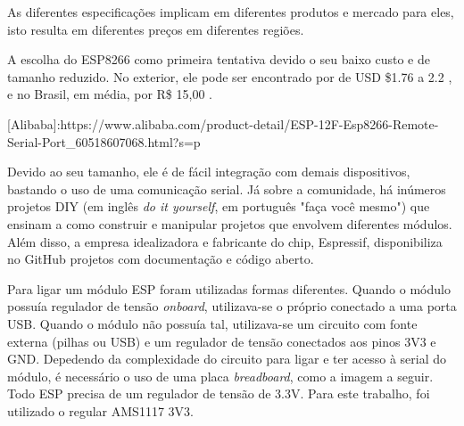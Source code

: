 As diferentes especificações implicam em diferentes produtos e mercado para
eles, isto resulta em diferentes preços em diferentes regiões.

\begin{table}[htb]
\end{table}

A escolha do ESP8266 como primeira tentativa devido o seu baixo custo e de
tamanho reduzido. No exterior, ele pode ser encontrado por de
USD \$1.76 a 2.2 , e no
Brasil, em média, por R\$ 15,00 .

[Alibaba]:https://www.alibaba.com/product-detail/ESP-12F-Esp8266-Remote-Serial-Port_60518607068.html?s=p

Devido ao seu tamanho, ele é de fácil integração com demais dispositivos,
bastando o uso de uma comunicação serial. Já sobre a comunidade, há inúmeros
projetos DIY (em inglês \emph{do it yourself}, em português "faça você mesmo") que
ensinam a como construir e manipular projetos que envolvem diferentes módulos.
Além disso, a empresa  idealizadora e fabricante do chip, Espressif,
disponibiliza no GitHub projetos com documentação e código aberto.


Para ligar um módulo ESP foram utilizadas formas diferentes. Quando o módulo
possuía regulador de tensão \emph{onboard}, utilizava-se o próprio conectado a uma
porta USB. Quando o módulo não possuía tal, utilizava-se um circuito com fonte
externa (pilhas ou USB) e um regulador de tensão conectados aos pinos 3V3 e GND.
Depedendo da complexidade do circuito para ligar e ter acesso à serial do
módulo, é necessário o uso de uma placa \emph{breadboard}, como a imagem a seguir.
Todo ESP precisa de um regulador de tensão de 3.3V. Para este trabalho, foi
utilizado o regular AMS1117 3V3.

